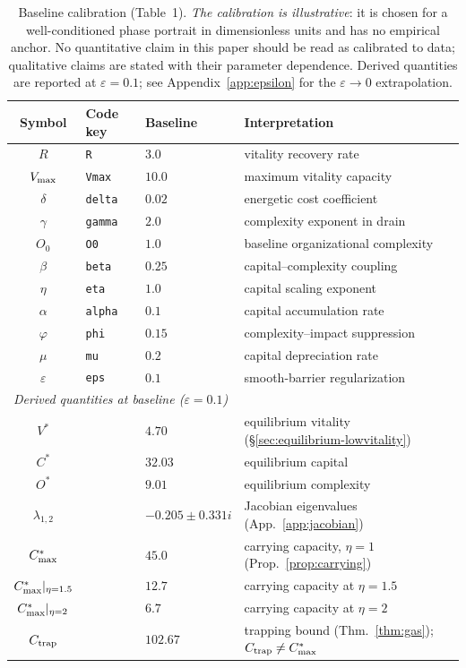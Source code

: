 \begin{table}[t]
\centering
\caption{Baseline calibration (Table~1). \emph{The calibration is
illustrative}: it is chosen for a well-conditioned phase portrait in
dimensionless units and has no empirical anchor. No quantitative claim in
this paper should be read as calibrated to data; qualitative claims are
stated with their parameter dependence. Derived quantities are reported at
$\varepsilon=0.1$; see Appendix~\ref{app:epsilon} for the
$\varepsilon\to0$ extrapolation.}
\label{tab:parameters}
\vspace{0.4em}
\begin{tabular}{clll}
\toprule
Symbol & Code key & Baseline & Interpretation \\
\midrule
$R$            & \texttt{R}     & $3.0$  & vitality recovery rate \\
$V_{\max}$        & \texttt{Vmax}  & $10.0$ & maximum vitality capacity \\
$\delta$       & \texttt{delta} & $0.02$ & energetic cost coefficient \\
$\gamma$       & \texttt{gamma} & $2.0$  & complexity exponent in drain \\
$O_0$          & \texttt{O0}    & $1.0$  & baseline organizational complexity \\
$\beta$        & \texttt{beta}  & $0.25$ & capital--complexity coupling \\
$\eta$         & \texttt{eta}   & $1.0$  & capital scaling exponent \\
$\alpha$       & \texttt{alpha} & $0.1$  & capital accumulation rate \\
$\varphi$      & \texttt{phi}   & $0.15$ & complexity--impact suppression \\
$\mu$          & \texttt{mu}    & $0.2$  & capital depreciation rate \\
$\varepsilon$  & \texttt{eps}   & $0.1$  & smooth-barrier regularization \\
\midrule
\multicolumn{4}{l}{\emph{Derived quantities at baseline ($\varepsilon=0.1$)}}\\
$V^{*}$        &                & $4.70$   & equilibrium vitality (\S\ref{sec:equilibrium-lowvitality}) \\
$C^{*}$        &                & $32.03$  & equilibrium capital \\
$O^{*}$        &                & $9.01$   & equilibrium complexity \\
$\lambda_{1,2}$&                & $-0.205\pm0.331i$ & Jacobian eigenvalues (App.~\ref{app:jacobian}) \\
$C^{*}_{\max}$        &                & $45.0$   & carrying capacity, $\eta=1$ (Prop.~\ref{prop:carrying}) \\
$C^{*}_{\max}|_{\eta=1.5}$ &           & $12.7$   & carrying capacity at $\eta=1.5$ \\
$C^{*}_{\max}|_{\eta=2}$   &           & $6.7$    & carrying capacity at $\eta=2$ \\
$C_{\mathrm{trap}}$       &                & $102.67$ & trapping bound (Thm.~\ref{thm:gas}); $C_{\mathrm{trap}}\neq C^{*}_{\max}$ \\
\bottomrule
\end{tabular}
\end{table}

